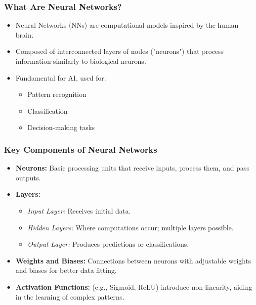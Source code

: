 \documentclass[aspectratio=169]{beamer}
\begin{document}
\frame{\titlepage}

\begin{frame}[fragile]
    \titlepage
\end{frame}

\begin{frame}[fragile]
    \frametitle{What Are Neural Networks?}
    \begin{itemize}
        \item Neural Networks (NNs) are computational models inspired by the human brain.
        \item Composed of interconnected layers of nodes ("neurons") that process information similarly to biological neurons.
        \item Fundamental for AI, used for:
        \begin{itemize}
            \item Pattern recognition
            \item Classification
            \item Decision-making tasks
        \end{itemize}
    \end{itemize}
\end{frame}

\begin{frame}[fragile]
    \frametitle{Key Components of Neural Networks}
    \begin{itemize}
        \item \textbf{Neurons:} Basic processing units that receive inputs, process them, and pass outputs.
        \item \textbf{Layers:}
        \begin{itemize}
            \item \textit{Input Layer:} Receives initial data.
            \item \textit{Hidden Layers:} Where computations occur; multiple layers possible.
            \item \textit{Output Layer:} Produces predictions or classifications.
        \end{itemize}
        \item \textbf{Weights and Biases:} Connections between neurons with adjustable weights and biases for better data fitting.
        \item \textbf{Activation Functions:} (e.g., Sigmoid, ReLU) introduce non-linearity, aiding in the learning of complex patterns.
    \end{itemize}
\end{frame}
\end{document}

